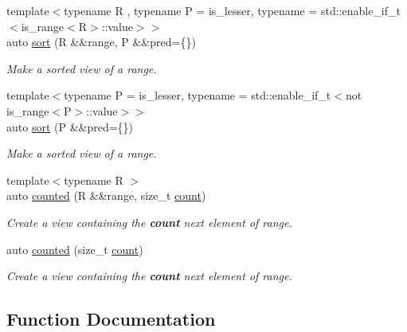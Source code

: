 \begin{DoxyCompactItemize}
{\footnotesize template$<$typename R , typename P  = is\+\_\+lesser, typename  = std\+::enable\+\_\+if\+\_\+t$<$is\+\_\+range$<$\+R$>$\+::value$>$$>$ }\\auto \mbox{\hyperlink{namespacerah_1_1view_a343ff36ca2b6470f2a55a89dfb4e3dc9}{sort}} (R \&\&range, P \&\&pred=\{\})
\begin{DoxyCompactList}\small\item\em Make a sorted view of a range. \end{DoxyCompactList}\item 
{\footnotesize template$<$typename P  = is\+\_\+lesser, typename  = std\+::enable\+\_\+if\+\_\+t$<$not is\+\_\+range$<$\+P$>$\+::value$>$$>$ }\\auto \mbox{\hyperlink{namespacerah_1_1view_aee3389bbe781c123aceb0d017a470e11}{sort}} (P \&\&pred=\{\})
\begin{DoxyCompactList}\small\item\em Make a sorted view of a range. \end{DoxyCompactList}\item 
{\footnotesize template$<$typename R $>$ }\\auto \mbox{\hyperlink{namespacerah_1_1view_a3ef591f1a04b16220fb967ddea5bc1e9}{counted}} (R \&\&range, size\+\_\+t \mbox{\hyperlink{namespacerah_aa528865cc4a45d4eb276329554f16b4b}{count}})
\begin{DoxyCompactList}\small\item\em Create a view containing the {\bfseries{count}} next element of range. \end{DoxyCompactList}\item 
auto \mbox{\hyperlink{namespacerah_1_1view_af359927d911e400baa372a8cb7817aa2}{counted}} (size\+\_\+t \mbox{\hyperlink{namespacerah_aa528865cc4a45d4eb276329554f16b4b}{count}})
\begin{DoxyCompactList}\small\item\em Create a view containing the {\bfseries{count}} next element of range. \end{DoxyCompactList}\end{DoxyCompactItemize}


\subsection{Function Documentation}
\mbox{\label{namespacerah_1_1view_acc7f1420accc862d2ac433ba9c697e95}} 
